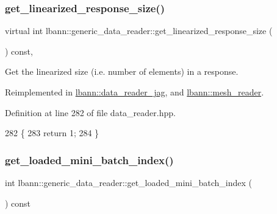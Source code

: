 \subsubsection{\texorpdfstring{get\+\_\+linearized\+\_\+response\+\_\+size()}{get\_linearized\_response\_size()}}
{\footnotesize\ttfamily virtual int lbann\+::generic\+\_\+data\+\_\+reader\+::get\+\_\+linearized\+\_\+response\+\_\+size (\begin{DoxyParamCaption}{ }\end{DoxyParamCaption}) const\hspace{0.3cm}{\ttfamily [inline]}, {\ttfamily [virtual]}}



Get the linearized size (i.\+e. number of elements) in a response. 



Reimplemented in \hyperlink{classlbann_1_1data__reader__jag_ad8e4752ead359374c9c7c10becf6aec1}{lbann\+::data\+\_\+reader\+\_\+jag}, and \hyperlink{classlbann_1_1mesh__reader_a52b64ae05dc20d8173e50019e2a3e6ce}{lbann\+::mesh\+\_\+reader}.



Definition at line 282 of file data\+\_\+reader.\+hpp.


\begin{DoxyCode}
282                                                    \{
283     \textcolor{keywordflow}{return} 1;
284   \}
\end{DoxyCode}
\mbox{\label{classlbann_1_1generic__data__reader_a56dca946c200cc25f6eae6e507939bba}} 
\subsubsection{\texorpdfstring{get\+\_\+loaded\+\_\+mini\+\_\+batch\+\_\+index()}{get\_loaded\_mini\_batch\_index()}}
{\footnotesize\ttfamily int lbann\+::generic\+\_\+data\+\_\+reader\+::get\+\_\+loaded\+\_\+mini\+\_\+batch\+\_\+index (\begin{DoxyParamCaption}{ }\end{DoxyParamCaption}) const\hspace{0.3cm}{\ttfamily [inline]}}



